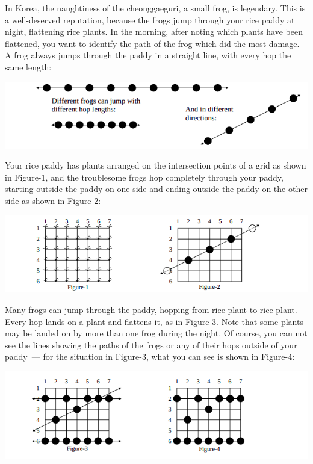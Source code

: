 In Korea, the naughtiness of the cheonggaeguri, a small frog, is legendary. This is a well-deserved reputation, because the frogs jump through your rice paddy at night, flattening rice plants. In the morning, after noting which plants have been flattened, you want to identify the path of the frog which did the most damage. A frog always jumps through the paddy in a straight line, with every hop the same length:

\begin{center}
\includegraphics[scale=0.7]{1.png}
\end{center}

Your rice paddy has plants arranged on the intersection points of a grid as shown in Figure-1, and the troublesome frogs hop completely through your paddy, starting outside the paddy on one side and ending outside the paddy on the other side as shown in Figure-2:

\begin{center}
\includegraphics[scale=0.8]{2.png}
\end{center}
Many frogs can jump through the paddy, hopping from rice plant to rice plant. Every hop lands on a plant and flattens it, as in Figure-3. Note that some plants may be landed on by more than one frog during the night. Of course, you can not see the lines showing the paths of the frogs or any of their hops outside of your paddy~--- for the situation in Figure-3, what you can see is shown in Figure-4:

\begin{center}
\includegraphics[scale=0.9]{3.png}
\end{center}

